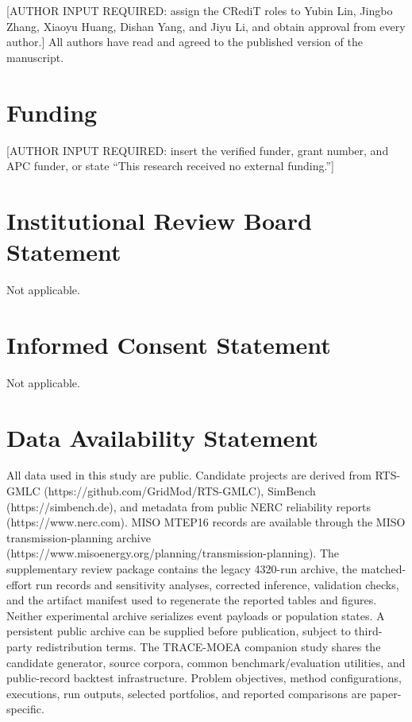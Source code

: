 \documentclass[applsci,article,submit,moreauthors]{Definitions/mdpi}
\begin{document}
{[}AUTHOR INPUT REQUIRED: assign the CRediT roles to Yubin Lin, Jingbo Zhang, Xiaoyu Huang, Dishan Yang, and Jiyu Li, and obtain approval from every author.{]} All authors have read and agreed to the published version of the manuscript.

\section*{Funding}

{[}AUTHOR INPUT REQUIRED: insert the verified funder, grant number, and APC funder, or state ``This research received no external funding.''{]}

\section*{Institutional Review Board Statement}

Not applicable.

\section*{Informed Consent Statement}

Not applicable.

\section*{Data Availability Statement}

All data used in this study are public. Candidate projects are derived from RTS-GMLC (https://github.com/GridMod/RTS-GMLC), SimBench (https://simbench.de), and metadata from public NERC reliability reports (https://www.nerc.com). MISO MTEP16 records are available through the MISO transmission-planning archive (https://www.misoenergy.org/planning/transmission-planning). The supplementary review package contains the legacy 4320-run archive, the matched-effort run records and sensitivity analyses, corrected inference, validation checks, and the artifact manifest used to regenerate the reported tables and figures. Neither experimental archive serializes event payloads or population states. A persistent public archive can be supplied before publication, subject to third-party redistribution terms. The TRACE-MOEA companion study shares the candidate generator, source corpora, common benchmark/evaluation utilities, and public-record backtest infrastructure. Problem objectives, method configurations, executions, run outputs, selected portfolios, and reported comparisons are paper-specific.
\end{document}
